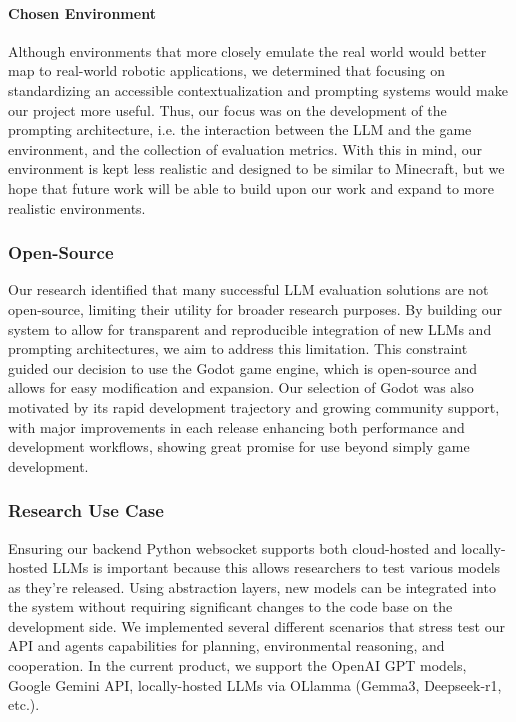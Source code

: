 \documentclass{article}
\begin{document}
\paragraph{Chosen Environment} Although environments that more closely emulate the real world would better map to real-world robotic applications, we determined that focusing on standardizing an accessible contextualization and prompting systems would make our project more useful.
Thus, our focus was on the development of the prompting architecture, i.e. the interaction between the LLM and the game environment, and the collection of evaluation metrics.
With this in mind, our environment is kept less realistic and designed to be similar to Minecraft, but we hope that future work will be able to build upon our work and expand to more realistic environments.

\subsubsection{Open-Source}
Our research identified that many successful LLM evaluation solutions are not open-source, limiting their utility for broader research purposes.
By building our system to allow for transparent and reproducible integration of new LLMs and prompting architectures, we aim to address this limitation.
This constraint guided our decision to use the Godot game engine, which is open-source and allows for easy modification and expansion.
Our selection of Godot was also motivated by its rapid development trajectory and growing community support, with major improvements in each release enhancing both performance and development workflows, showing great promise for use beyond simply game development.

\subsubsection{Research Use Case}
Ensuring our backend Python websocket supports both cloud-hosted and locally-hosted LLMs is important because this allows researchers to test various models as they're released.
Using abstraction layers, new models can be integrated into the system without requiring significant changes to the code base on the development side.
We implemented several different scenarios that stress test our API and agents capabilities for planning, environmental reasoning, and cooperation.
In the current product, we support the OpenAI GPT models, Google Gemini API, locally-hosted LLMs via OLlamma (Gemma3, Deepseek-r1, etc.).
\end{document}
